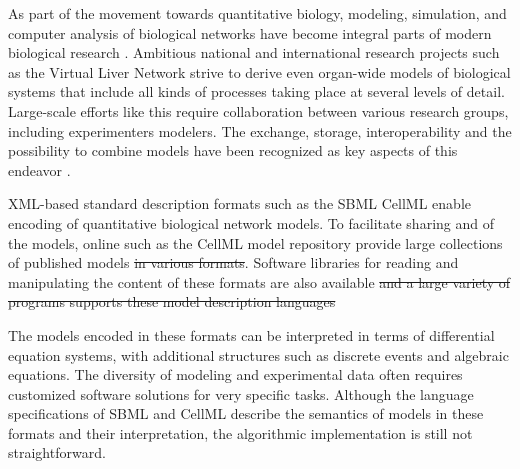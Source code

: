 \documentclass[10pt]{bmc_article}
\newenvironment{bmcformat}{\begin{raggedright}\baselineskip20pt\sloppy\setboolean{publ}{false}}{\end{raggedright}\baselineskip20pt\sloppy}
\begin{document}
\begin{bmcformat}
As part of the movement towards quantitative biology,  modeling, 
simulation, and computer analysis of biological networks have become integral
parts of modern biological research \cite{Macilwain2011}.
Ambitious national and international research projects such as the Virtual Liver
Network \cite{Holzhuetter2012} strive to derive even organ-wide models of
biological systems that include all kinds of processes taking place at several
levels of detail.
Large-scale efforts like this require  collaboration between various
research groups, including experimenters\COR{,} modelers.
The exchange, storage, interoperability\COR{,} and the possibility to combine models have been recognized as
key aspects of this endeavor \cite{Schulz2006, Klipp2007, Chelliah2009, Liebermeister2009sta}.

XML-based standard description formats %
such as the \acf{SBML} \cite{M.Hucka03012003, SBML2013}  CellML
\cite{Lloyd2004, CellML2013} enable encoding of quantitative biological network
models.
To facilitate sharing and  of the models, online 
such as  \cite{Li2010a}  the CellML model
repository \cite{Lloyd2008} provide large collections of published models\sout{ in various formats}.
Software libraries for reading and manipulating the content of these formats are
also available \cite{Bornstein2008, Miller2010, Draeger2011b}
\sout{and a large variety of programs supports these model description languages}

The models encoded in these formats can be interpreted in terms of 
differential equation systems, with additional structures such as
discrete events and algebraic equations.
The diversity of modeling  and experimental data often requires
customized software solutions for very specific tasks.
Although the language specifications of \acs{SBML} \cite{Hucka2001, Hucka2003,
Finney2003a, Finney2006, Hucka2007, Hucka2008, Hucka2010a} 
and CellML \cite{Cuellar2006} describe the semantics of models in these formats
and their interpretation, the algorithmic implementation is still not
straightforward.


\end{bmcformat}
\end{document}
